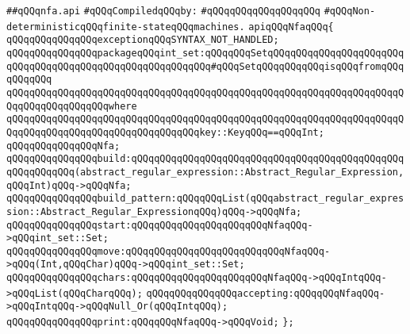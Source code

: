\label{src/lib/regex/backend/nfa.api}
\verb|##qQQqnfa.api|\newline
\newline
\verb|#qQQqCompiledqQQqby:|\newline
\verb|#qQQqqQQqqQQqqQQqqQQq|\newline
\newline
\verb|#qQQqNon-deterministicqQQqfinite-stateqQQqmachines.|\newline
\newline
\newline
\newline
\verb|apiqQQqNfaqQQq{|\newline
\newline
\verb|qQQqqQQqqQQqqQQqexceptionqQQqSYNTAX_NOT_HANDLED;|\newline
\newline
\verb|qQQqqQQqqQQqqQQqpackageqQQqint_set:qQQqqQQqSetqQQqqQQqqQQqqQQqqQQqqQQqqQQqqQQqqQQqqQQqqQQqqQQqqQQqqQQqqQQq#qQQqSetqQQqqQQqqQQqisqQQqfromqQQqqQQqqQQq|\newline
\verb|qQQqqQQqqQQqqQQqqQQqqQQqqQQqqQQqqQQqqQQqqQQqqQQqqQQqqQQqqQQqqQQqqQQqqQQqqQQqqQQqqQQqqQQqwhere|\newline
\verb|qQQqqQQqqQQqqQQqqQQqqQQqqQQqqQQqqQQqqQQqqQQqqQQqqQQqqQQqqQQqqQQqqQQqqQQqqQQqqQQqqQQqqQQqqQQqqQQqqQQqqQQqkey::KeyqQQq==qQQqInt;|\newline
\newline
\verb|qQQqqQQqqQQqqQQqNfa;|\newline
\newline
\verb|qQQqqQQqqQQqqQQqbuild:qQQqqQQqqQQqqQQqqQQqqQQqqQQqqQQqqQQqqQQqqQQqqQQqqQQqqQQqqQQq(abstract_regular_expression::Abstract_Regular_Expression,qQQqInt)qQQq->qQQqNfa;|\newline
\verb|qQQqqQQqqQQqqQQqbuild_pattern:qQQqqQQqList(qQQqabstract_regular_expression::Abstract_Regular_ExpressionqQQq)qQQq->qQQqNfa;|\newline
\newline
\verb|qQQqqQQqqQQqqQQqstart:qQQqqQQqqQQqqQQqqQQqqQQqNfaqQQq->qQQqint_set::Set;|\newline
\verb|qQQqqQQqqQQqqQQqmove:qQQqqQQqqQQqqQQqqQQqqQQqqQQqNfaqQQq->qQQq(Int,qQQqChar)qQQq->qQQqint_set::Set;|\newline
\verb|qQQqqQQqqQQqqQQqchars:qQQqqQQqqQQqqQQqqQQqqQQqNfaqQQq->qQQqIntqQQq->qQQqList(qQQqCharqQQq);|\newline
\verb|qQQqqQQqqQQqqQQqaccepting:qQQqqQQqNfaqQQq->qQQqIntqQQq->qQQqNull_Or(qQQqIntqQQq);|\newline
\newline
\verb|qQQqqQQqqQQqqQQqprint:qQQqqQQqNfaqQQq->qQQqVoid;|\newline
\verb|};|\newline
\newline
\newline

